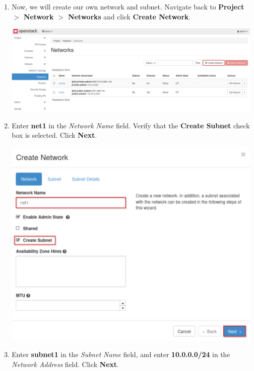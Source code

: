\documentclass[letterpaper, 12pt]{article}
\begin{document}
\begin{enumerate}
    \item Now, we will create our own network and subnet.
    Navigate back to \textbf{Project $>$ Network $>$ Networks} and click \textbf{Create Network}.

    \begin{center}
        \includegraphics[width=\linewidth]{images/part3/step7.png}
    \end{center}

    \item Enter \textbf{net1} in the \textit{Network Name} field.
    Verify that the \textbf{Create Subnet} check box is selected.
    Click \textbf{Next}.

    \begin{center}
        \includegraphics[width=\linewidth]{images/part3/step8.png}
    \end{center}

    \item Enter \textbf{subnet1} in the \textit{Subnet Name} field, and enter \textbf{10.0.0.0/24} in the \textit{Network Address} field.
    Click \textbf{Next}.


\end{enumerate}
\end{document}

